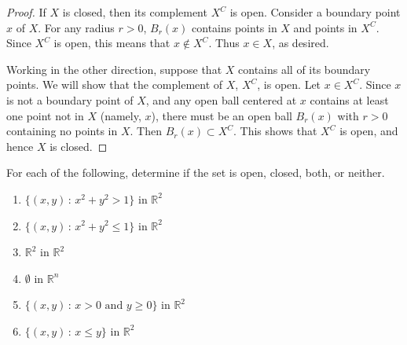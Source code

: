 \documentclass{ximera}
\begin{document}
\begin{proof}
If $X$ is closed, then its complement $X^C$ is open. Consider a boundary point $x$ of $X$. For any radius $r>0$, $B_r(x)$ contains points in $X$ and points in $X^C$. Since $X^C$ is open, this means that $x\notin X^C$. Thus $x\in X$, as desired.

Working in the other direction, suppose that $X$ contains all of its boundary points. We will show that the complement of $X$, $X^C$, is open. Let $x\in X^C$. Since $x$ is not a boundary point of $X$, and any open ball centered at $x$ contains at least one point not in $X$ (namely, $x$), there must be an open ball $B_r(x)$ with $r>0$ containing no points in $X$. Then $B_r(x)\subset X^C$. This shows that $X^C$ is open, and hence $X$ is closed.
\end{proof}

\begin{problem}

For each of the following, determine if the set is open, closed, both, or neither.

\begin{enumerate}
\item $\{(x,y)\,:\,x^2+y^2>1\}$ in $\mathbb{R}^2$
\begin{multipleChoice}
\end{multipleChoice}			%
\item $\{(x,y)\,:\,x^2+y^2\leq 1\}$ in $\mathbb{R}^2$
\begin{multipleChoice}
\end{multipleChoice}			%
\item $\mathbb{R}^2$ in $\mathbb{R}^2$
\begin{multipleChoice}
\end{multipleChoice}			%
\item $\emptyset$ in $\mathbb{R}^n$
\begin{multipleChoice}
\end{multipleChoice}			%
\item $\{(x,y)\,:\,x> 0\textrm{ and }y\geq 0\}$ in $\mathbb{R}^2$
\begin{multipleChoice}
\end{multipleChoice}			%
\item $\{(x,y)\,:\,x\leq y\}$ in $\mathbb{R}^2$
\begin{multipleChoice}
\end{multipleChoice}			%
\end{enumerate}

\end{problem}
\end{document}
